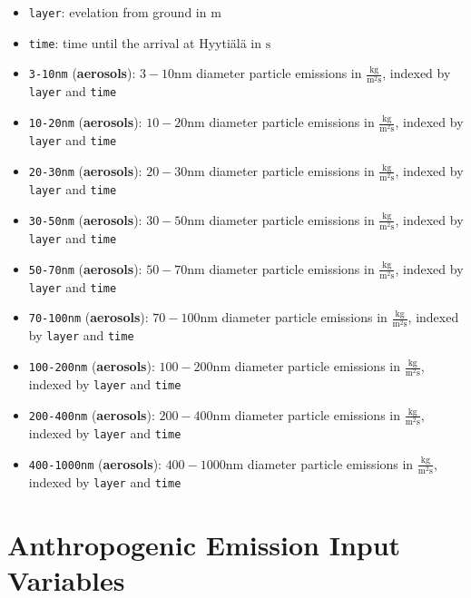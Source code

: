 \begin{itemize}
    \item \texttt{layer}: evelation from ground in $\text{m}$
    \item \texttt{time}: time until the arrival at Hyyti\"al\"a in $\text{s}$
    \item \texttt{3-10nm} (\textbf{aerosols}): $3-10\text{nm}$ diameter particle emissions in $\frac{\text{kg}}{\text{m}^2 \text{s}}$, indexed by \texttt{layer} and \texttt{time}
    \item \texttt{10-20nm} (\textbf{aerosols}): $10-20\text{nm}$ diameter particle emissions in $\frac{\text{kg}}{\text{m}^2 \text{s}}$, indexed by \texttt{layer} and \texttt{time}
    \item \texttt{20-30nm} (\textbf{aerosols}): $20-30\text{nm}$ diameter particle emissions in $\frac{\text{kg}}{\text{m}^2 \text{s}}$, indexed by \texttt{layer} and \texttt{time}
    \item \texttt{30-50nm} (\textbf{aerosols}): $30-50\text{nm}$ diameter particle emissions in $\frac{\text{kg}}{\text{m}^2 \text{s}}$, indexed by \texttt{layer} and \texttt{time}
    \item \texttt{50-70nm} (\textbf{aerosols}): $50-70\text{nm}$ diameter particle emissions in $\frac{\text{kg}}{\text{m}^2 \text{s}}$, indexed by \texttt{layer} and \texttt{time}
    \item \texttt{70-100nm} (\textbf{aerosols}): $70-100\text{nm}$ diameter particle emissions in $\frac{\text{kg}}{\text{m}^2 \text{s}}$, indexed by \texttt{layer} and \texttt{time}
    \item \texttt{100-200nm} (\textbf{aerosols}): $100-200\text{nm}$ diameter particle emissions in $\frac{\text{kg}}{\text{m}^2 \text{s}}$, indexed by \texttt{layer} and \texttt{time}
    \item \texttt{200-400nm} (\textbf{aerosols}): $200-400\text{nm}$ diameter particle emissions in $\frac{\text{kg}}{\text{m}^2 \text{s}}$, indexed by \texttt{layer} and \texttt{time}
    \item \texttt{400-1000nm} (\textbf{aerosols}): $400-1000\text{nm}$ diameter particle emissions in $\frac{\text{kg}}{\text{m}^2 \text{s}}$, indexed by \texttt{layer} and \texttt{time}
\end{itemize}

\section{Anthropogenic Emission Input Variables}

